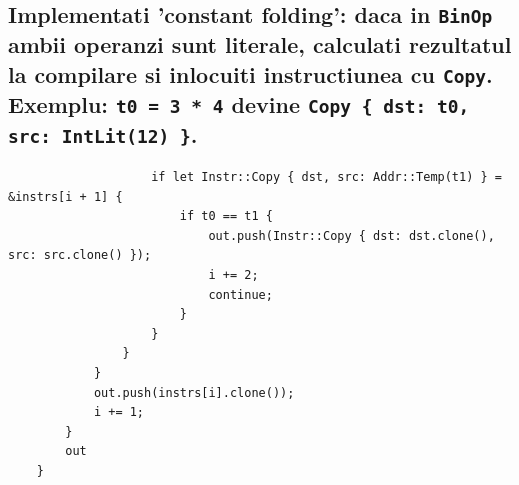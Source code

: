 \documentclass[11pt]{article}
\begin{document}
\subsection{Implementati 'constant folding': daca in \texttt{BinOp} ambii operanzi sunt literale, calculati rezultatul la compilare si inlocuiti instructiunea cu \texttt{Copy}. Exemplu: \texttt{t0 = 3 * 4} devine \texttt{Copy \{ dst: t0, src: IntLit(12) \}}.}
\label{sec:org455b227}
\begin{verbatim}
                    if let Instr::Copy { dst, src: Addr::Temp(t1) } = &instrs[i + 1] {
                        if t0 == t1 {
                            out.push(Instr::Copy { dst: dst.clone(), src: src.clone() });
                            i += 2;
                            continue;
                        }
                    }
                }
            }
            out.push(instrs[i].clone());
            i += 1;
        }
        out
    }


\end{verbatim}
\end{document}
